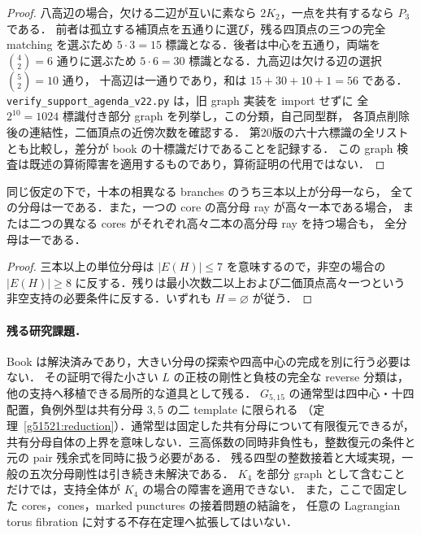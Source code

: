 \begin{proof}
八高辺の場合，欠ける二辺が互いに素なら $2K_2$，一点を共有するなら $P_3$ である．
前者は孤立する補頂点を五通りに選び，残る四頂点の三つの完全 matching を選ぶため
$5\cdot3=15$ 標識となる．後者は中心を五通り，両端を $\binom42=6$ 通りに選ぶため
$5\cdot6=30$ 標識となる．九高辺は欠ける辺の選択 $\binom52=10$ 通り，
十高辺は一通りであり，和は $15+30+10+1=56$ である．
\nolinkurl{verify_support_agenda_v22.py} は，旧 graph 実装を import せずに
全 $2^{10}=1024$ 標識付き部分 graph を列挙し，この分類，自己同型群，
各頂点削除後の連結性，二価頂点の近傍次数を確認する．
第20版の六十六標識の全リストとも比較し，差分が book の十標識だけであることを記録する．
この graph 検査は既述の算術障害を適用するものであり，算術証明の代用ではない．
\end{proof}

\begin{corollary}[三本の単位分母からの伝播]
\label{sf22:three-unit-branches}
同じ仮定の下で，十本の相異なる branches のうち三本以上が分母一なら，
全ての分母は一である．また，一つの core の高分母 ray が高々一本である場合，
または二つの異なる cores がそれぞれ高々二本の高分母 ray を持つ場合も，
全分母は一である．
\end{corollary}

\begin{proof}
三本以上の単位分母は $|E(H)|\le7$ を意味するので，非空の場合の
$|E(H)|\ge8$ に反する．残りは最小次数二以上および二価頂点高々一つという
非空支持の必要条件に反する．いずれも $H=\varnothing$ が従う．
\end{proof}

\paragraph{残る研究課題．}
Book は解決済みであり，大きい分母の探索や四高中心の完成を別に行う必要はない．
その証明で得た小さい $L$ の正枝の剛性と負枝の完全な reverse 分類は，
他の支持へ移植できる局所的な道具として残る．
$G_{5,15}$ の通常型は四中心・十四配置，負例外型は共有分母 $3,5$ の二 template に限られる
（定理~\ref{g51521:reduction}）．通常型は固定した共有分母について有限復元できるが，
共有分母自体の上界を意味しない．三高係数の同時非負性も，整数復元の条件と
元の pair 残余式を同時に扱う必要がある．
残る四型の整数接着と大域実現，一般の五次分母剛性は引き続き未解決である．
$K_4$ を部分 graph として含むことだけでは，支持全体が $K_4$ の場合の障害を適用できない．
また，ここで固定した cores，cones，marked punctures の接着問題の結論を，
任意の Lagrangian torus fibration に対する不存在定理へ拡張してはいない．
